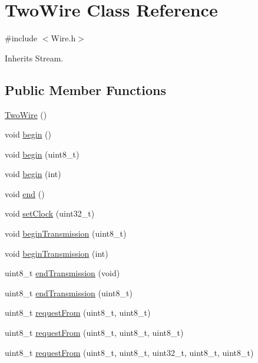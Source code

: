 \hypertarget{class_two_wire}{}\section{Two\+Wire Class Reference}
\label{class_two_wire}


{\ttfamily \#include $<$Wire.\+h$>$}



Inherits Stream.

\subsection*{Public Member Functions}
\begin{DoxyCompactItemize}
\item 
\hyperlink{class_two_wire_a4c7daf378c06e5e72762e1bd3d5937b6}{Two\+Wire} ()
\item 
void \hyperlink{class_two_wire_ada85a7a8663ec8af0a1248b659be2f18}{begin} ()
\item 
void \hyperlink{class_two_wire_a28bca087ed188781ef15e72622d3b1fb}{begin} (uint8\+\_\+t)
\item 
void \hyperlink{class_two_wire_a2806aa5684d36d7d20bf7c51cab3e602}{begin} (int)
\item 
void \hyperlink{class_two_wire_a13cca813f6dd0201ac70178b18ba0946}{end} ()
\item 
void \hyperlink{class_two_wire_a3c4aaae8779a8c34d8a1a90ff317d982}{set\+Clock} (uint32\+\_\+t)
\item 
void \hyperlink{class_two_wire_a8d55f00ea8ac3d7427d62e0c71e95ec2}{begin\+Transmission} (uint8\+\_\+t)
\item 
void \hyperlink{class_two_wire_a4da95eb4adced5dad152344243e57aad}{begin\+Transmission} (int)
\item 
uint8\+\_\+t \hyperlink{class_two_wire_af80f9a7b85a3a81a035ca94c95bcdc1d}{end\+Transmission} (void)
\item 
uint8\+\_\+t \hyperlink{class_two_wire_a289f5ef9bb0f79b31095fd72402ed54a}{end\+Transmission} (uint8\+\_\+t)
\item 
uint8\+\_\+t \hyperlink{class_two_wire_ae27d0936487551a05a1e9901bc456599}{request\+From} (uint8\+\_\+t, uint8\+\_\+t)
\item 
uint8\+\_\+t \hyperlink{class_two_wire_a4b4b618531a04d5488a52583a3dfb173}{request\+From} (uint8\+\_\+t, uint8\+\_\+t, uint8\+\_\+t)
\item 
uint8\+\_\+t \hyperlink{class_two_wire_acd59cc9570fd49b1cf9044cbefef85ac}{request\+From} (uint8\+\_\+t, uint8\+\_\+t, uint32\+\_\+t, uint8\+\_\+t, uint8\+\_\+t)

\end{DoxyCompactItemize}
